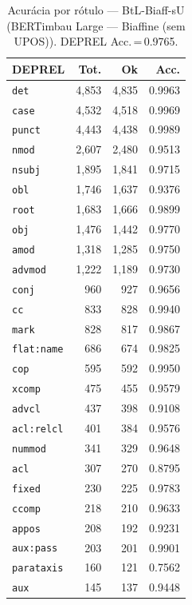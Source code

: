 \begin{table}[ht]
\centering
\caption{Acurácia por rótulo --- BtL-Biaff-sU (BERTimbau Large — Biaffine (sem UPOS)). DEPREL Acc.\,=\,0.9765.}
\label{tab:acc-predict-test-ablacao-biaffine-neuralmind-bert-large-portuguese-cased-fold0}
\scriptsize
\begin{tabular}{lrrr}
\toprule
\textbf{DEPREL} & \textbf{Tot.} & \textbf{Ok} & \textbf{Acc.} \\
\midrule
\texttt{det} & 4,853 & 4,835 & 0.9963 \\
\texttt{case} & 4,532 & 4,518 & 0.9969 \\
\texttt{punct} & 4,443 & 4,438 & 0.9989 \\
\texttt{nmod} & 2,607 & 2,480 & 0.9513 \\
\texttt{nsubj} & 1,895 & 1,841 & 0.9715 \\
\texttt{obl} & 1,746 & 1,637 & 0.9376 \\
\texttt{root} & 1,683 & 1,666 & 0.9899 \\
\texttt{obj} & 1,476 & 1,442 & 0.9770 \\
\texttt{amod} & 1,318 & 1,285 & 0.9750 \\
\texttt{advmod} & 1,222 & 1,189 & 0.9730 \\
\texttt{conj} & 960 & 927 & 0.9656 \\
\texttt{cc} & 833 & 828 & 0.9940 \\
\texttt{mark} & 828 & 817 & 0.9867 \\
\texttt{flat\!:\!name} & 686 & 674 & 0.9825 \\
\texttt{cop} & 595 & 592 & 0.9950 \\
\texttt{xcomp} & 475 & 455 & 0.9579 \\
\texttt{advcl} & 437 & 398 & 0.9108 \\
\texttt{acl\!:\!relcl} & 401 & 384 & 0.9576 \\
\texttt{nummod} & 341 & 329 & 0.9648 \\
\texttt{acl} & 307 & 270 & 0.8795 \\
\texttt{fixed} & 230 & 225 & 0.9783 \\
\texttt{ccomp} & 218 & 210 & 0.9633 \\
\texttt{appos} & 208 & 192 & 0.9231 \\
\texttt{aux\!:\!pass} & 203 & 201 & 0.9901 \\
\texttt{parataxis} & 160 & 121 & 0.7562 \\
\texttt{aux} & 145 & 137 & 0.9448 \\

\end{tabular}
\end{table}
